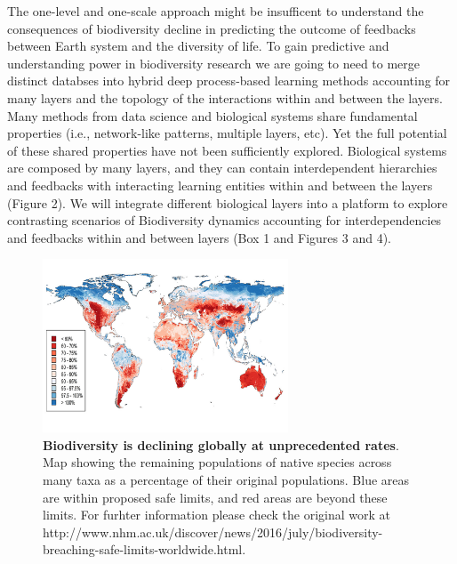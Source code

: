 \documentclass[authoryear,1p,12pt]{elsarticle}
\begin{document}
     The one-level and one-scale approach might be insufficent to
     understand the consequences of biodiversity decline in predicting
     the outcome of feedbacks between Earth system and the diversity
     of life. To gain predictive and understanding power in
     biodiversity research we are going to need to merge distinct
     databses into hybrid deep process-based learning methods
     accounting for many layers and the topology of the interactions
     within and between the layers\citep{Melianetal:2018}. Many
     methods from data science and biological systems share
     fundamental properties (i.e., network-like patterns, multiple
     layers, etc). Yet the full potential of these shared properties
     have not been sufficiently explored. Biological systems are
     composed by many layers, and they can contain interdependent
     hierarchies and feedbacks with interacting learning entities
     within and between the layers (Figure 2). We will integrate
     different biological layers into a platform to explore
     contrasting scenarios of Biodiversity dynamics accounting for
     interdependencies and feedbacks within and between layers (Box 1
     and Figures 3 and 4).


\begin{figure}
  \begin{center}
       \includegraphics[width=0.65\textwidth]{Figure1}
  \end{center}
     \vspace{-0.7 in}
     \caption{{\bf Biodiversity is declining globally at unprecedented
         rates}. Map showing the remaining populations of native
       species across many taxa as a percentage of their original
       populations. Blue areas are within proposed safe limits, and
       red areas are beyond these limits. For furhter information
       please check the original work at
       {http://www.nhm.ac.uk/discover/news/2016/july/biodiversity-breaching-safe-limits-worldwide.html}.}
\end{figure}
\end{document}
